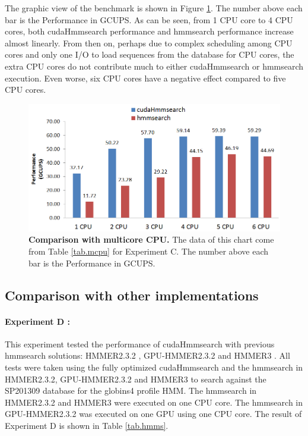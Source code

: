 The graphic view of the benchmark is shown in Figure \ref{fig:cpuCores}. The number above each bar is the Performance in GCUPS. As can be seen, from 1 CPU core to 4 CPU cores, both cudaHmmsearch performance and hmmsearch performance increase almost linearly. From then on, perhaps due to complex scheduling among CPU cores and only one I/O to load sequences from the database for CPU cores, the extra CPU cores do not contribute much to either cudaHmmsearch or hmmsearch execution. Even worse, six CPU cores have a negative effect compared to five CPU cores.

\begin{figure}[!htb]
	\centering
	\includegraphics[totalheight=0.25\textheight]{Figures/cpuCores.png}
	\caption{\selectfont \textbf{Comparison with multicore CPU.} The data of this chart come from Table \ref{tab.mcpu} for Experiment C. The number above each bar is the Performance in GCUPS.}
	\label{fig:cpuCores}
\end{figure}

\subsection{Comparison with other implementations}
\paragraph*{Experiment D : } This experiment tested the performance of cudaHmmsearch with previous hmmsearch solutions: HMMER2.3.2 \citep{HMMER2}, GPU-HMMER2.3.2 \citep{GPUHMM} and HMMER3 \citep{Hsource}.
All tests were taken using the fully optimized cudaHmmsearch and the hmmsearch in HMMER2.3.2, GPU-HMMER2.3.2 and HMMER3 to search against the SP201309 database for the globins4 profile HMM. The hmmsearch in HMMER2.3.2 and HMMER3 were executed on one CPU core. The hmmsearch in GPU-HMMER2.3.2 was executed on one GPU using one CPU core. The result of Experiment D is shown in Table \ref{tab.hmms}.

